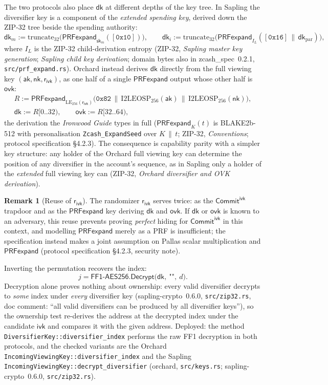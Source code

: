 \documentclass[11pt,a4paper]{article}
\theoremstyle{definition}
\newtheorem{remark}[theorem]{Remark}
\newcommand{\CommitIvk}{\ensuremath{\mathsf{Commit}^{\mathsf{ivk}}}}
\newcommand{\aksym}{\ensuremath{\mathsf{ak}}}
\newcommand{\nksym}{\ensuremath{\mathsf{nk}}}
\newcommand{\ivk}{\ensuremath{\mathsf{ivk}}}
\newcommand{\ovk}{\ensuremath{\mathsf{ovk}}}
\newcommand{\dk}{\ensuremath{\mathsf{dk}}}
\newcommand{\rivk}{\ensuremath{\mathsf{r_{ivk}}}}
\begin{document}
The two protocols also place $\dk$ at different depths of the key tree. In
Sapling the diversifier key is a component of the \emph{extended spending
key}, derived down the ZIP-32 tree beside the spending authority:
\[
\dk_m := \mathrm{truncate}_{32}\bigl(
\mathsf{PRFexpand}_{\mathsf{sk}_m}([\mathtt{0x10}])\bigr),
\qquad
\dk_i := \mathrm{truncate}_{32}\bigl(
\mathsf{PRFexpand}_{I_L}([\mathtt{0x16}] \,\|\, \dk_{\mathrm{par}})\bigr),
\]
where $I_L$ is the ZIP-32 child-derivation entropy (ZIP-32, \emph{Sapling
master key generation}; \emph{Sapling child key derivation}; domain bytes
also in \textsf{zcash\_spec}~0.2.1, \texttt{src/prf\_expand.rs}). Orchard
instead derives $\dk$ directly from the full viewing key
$(\aksym, \nksym, \rivk)$, as one half of a single $\mathsf{PRFexpand}$
output whose other half is $\ovk$:
\[
\begin{gathered}
R := \mathsf{PRFexpand}_{\mathrm{LE}_{256}(\rivk)}\bigl(\mathtt{0x82}
\,\|\, \mathrm{I2LEOSP}_{256}(\aksym) \,\|\,
\mathrm{I2LEOSP}_{256}(\nksym)\bigr), \\
\dk := R[0..32), \qquad \ovk := R[32..64),
\end{gathered}
\]
the derivation the \emph{Ironwood Guide} types in full
($\mathsf{PRFexpand}_K(t)$ is BLAKE2b-512 with personalisation
\texttt{Zcash\_ExpandSeed} over $K \,\|\, t$; ZIP-32, \emph{Conventions};
protocol specification \S4.2.3). The consequence is capability parity with
a simpler key structure: any holder of the Orchard full viewing key can
determine the position of any diversifier in the account's sequence, as in
Sapling only a holder of the \emph{extended} full viewing key can (ZIP-32,
\emph{Orchard diversifier and OVK derivation}).

\begin{remark}[Reuse of $\rivk$]\label{rem:rivk-reuse}
The randomizer $\rivk$ serves twice: as the $\CommitIvk$ trapdoor and as
the $\mathsf{PRFexpand}$ key deriving $\dk$ and $\ovk$. If $\dk$ or $\ovk$
is known to an adversary, this reuse prevents proving \emph{perfect} hiding
for $\CommitIvk$ in this context, and modelling $\mathsf{PRFexpand}$ merely
as a PRF is insufficient; the specification instead makes a joint
assumption on Pallas scalar multiplication and $\mathsf{PRFexpand}$
(protocol specification \S4.2.3, security note).
\end{remark}

Inverting the permutation recovers the index:
\[
j = \mathsf{FF1\text{-}AES256.Decrypt}\bigl(\dk,\ \texttt{""},\ d\bigr).
\]
Decryption alone proves nothing about ownership: every valid diversifier
decrypts to \emph{some} index under \emph{every} diversifier key
(\textsf{sapling-crypto}~0.6.0, \texttt{src/zip32.rs}, doc comment: ``all
valid diversifiers can be produced by all diversifier keys''), so the
ownership test re-derives the address at the decrypted index under the
candidate $\ivk$ and compares it with the given address. Deployed: the
method \texttt{DiversifierKey::diversifier\_index} performs the raw FF1
decryption in both protocols, and the checked variants are the Orchard
\texttt{IncomingViewingKey::diversifier\_index} and the Sapling
\texttt{IncomingViewingKey::decrypt\_diversifier} (\textsf{orchard},
\texttt{src/keys.rs}; \textsf{sapling-crypto}~0.6.0,
\texttt{src/zip32.rs}).
\end{document}
